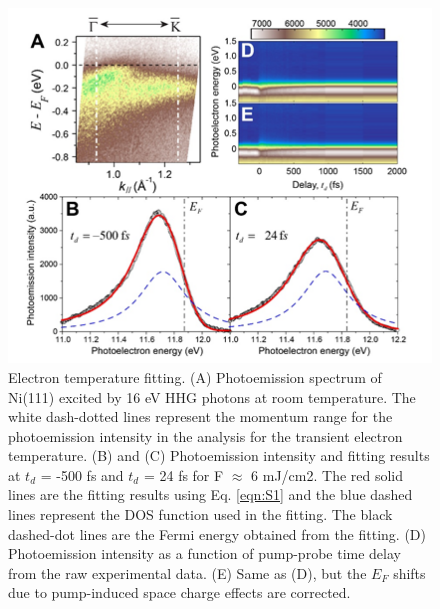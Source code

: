 \begin{figure}[htbp]
	\begin{center}
		\includegraphics[width=150mm]{figs/NiFigS2}
	\end{center}
	\caption{Electron temperature fitting. (A) Photoemission spectrum of Ni(111) excited by 16 eV HHG photons at room temperature. The white dash-dotted lines represent the momentum range for the photoemission intensity in the analysis for the transient electron temperature. (B) and (C) Photoemission intensity and fitting results at $t_d$ = -500 fs and $t_d$ = 24 fs for F $\approx$ 6 mJ/cm2. The red solid lines are the fitting results using Eq. \ref{eqn:S1} and the blue dashed lines represent the DOS function used in the fitting. The black dashed-dot lines are the Fermi energy obtained from the fitting. (D) Photoemission intensity as a function of pump-probe time delay from the raw experimental data. (E) Same as (D), but the $E_F$ shifts due to pump-induced space charge effects are corrected. }
	\label{fig: NiSIfig2}
\end{figure}

